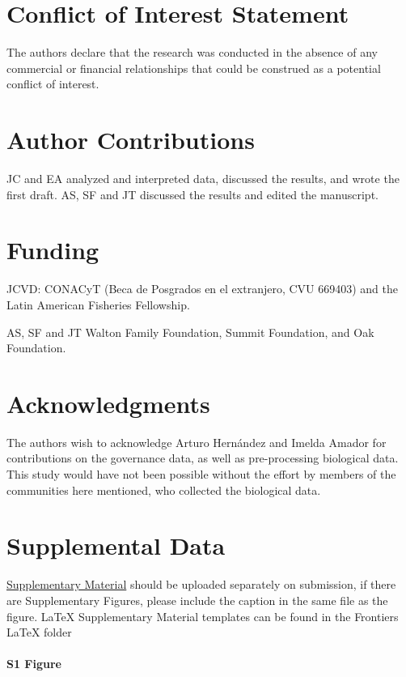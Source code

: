 \documentclass{frontiersSCNS}
\theoremstyle{definition}
\theoremstyle{definition}
\theoremstyle{definition}
\theoremstyle{remark}
\begin{document}
\section*{Conflict of Interest Statement}

The authors declare that the research was conducted in the absence of
any commercial or financial relationships that could be construed as a
potential conflict of interest.

\section*{Author Contributions}

JC and EA analyzed and interpreted data, discussed the results, and
wrote the first draft. AS, SF and JT discussed the results and edited
the manuscript.

\section*{Funding}

JCVD: CONACyT (Beca de Posgrados en el extranjero, CVU 669403) and the
Latin American Fisheries Fellowship.

AS, SF and JT Walton Family Foundation, Summit Foundation, and Oak
Foundation.

\section*{Acknowledgments}

The authors wish to acknowledge Arturo Hernández and Imelda Amador for
contributions on the governance data, as well as pre-processing
biological data. This study would have not been possible without the
effort by members of the communities here mentioned, who collected the
biological data.

\section*{Supplemental Data}

\href{http://home.frontiersin.org/about/author-guidelines#SupplementaryMaterial}{Supplementary Material}
should be uploaded separately on submission, if there are Supplementary
Figures, please include the caption in the same file as the figure.
LaTeX Supplementary Material templates can be found in the Frontiers
LaTeX folder

\paragraph*{S1 Figure}
\label{S1_Figure}
\end{document}

